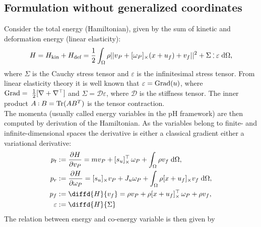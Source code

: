 \subsection{Formulation without generalized coordinates}
Consider the total energy (Hamiltonian), given by the sum of kinetic and deformation energy (linear elasticity):
\begin{equation}
\begin{aligned}
H = H_{\text{kin}} + H_{\text{def}} = \frac{1}{2} \int_{\Omega} \rho ||v_P + \crmat{\omega_P} (x+u_f) + v_f||^2 + \Sigma \cddot \varepsilon  \d{\Omega},
\end{aligned}
\end{equation}
where $\Sigma$ is the Cauchy stress tensor and $\varepsilon$ is the infinitesimal stress tensor. From linear elasticity theory it is well known that $\varepsilon = \operatorname*{Grad}(u)$, where $\operatorname*{Grad}=~\frac{1}{2} [\nabla + \nabla^\top]$ and $\Sigma = \mathcal{D} \varepsilon$, where $\mathcal{D}$ is the stiffness tensor. The inner product $A \cddot B = \Tr(A B^T)$ is the tensor contraction. \\  
The momenta (usually called energy variables in the pH framework) are then computed by derivation of the Hamiltonian. As the variables belong to finite- and infinite-dimensional spaces the derivative is either a classical gradient either a variational derivative:
\begin{equation}
\label{eq:momenta}
\begin{aligned}
p_t &:= \diffp{H}{v_P} = m v_P + \crmat{s_u}^\top \, \omega_P + \int_{\Omega} \rho v_f \d{\Omega}, \\
p_r &:= \diffp{H}{\omega_P} = \crmat{s_u} v_P + J_u \omega_P + \int_{\Omega} \rho \crmat{x+u_f} v_f \d{\Omega}, \\
p_f &:= \diffd{H}{v_f} = \rho v_P + \rho \crmat{x+u_f}^\top \, \omega_P + \rho v_f, \\
\varepsilon &:= \diffd{H}{\Sigma}
\end{aligned}
\end{equation}
The relation between energy and co-energy variable is then given by
